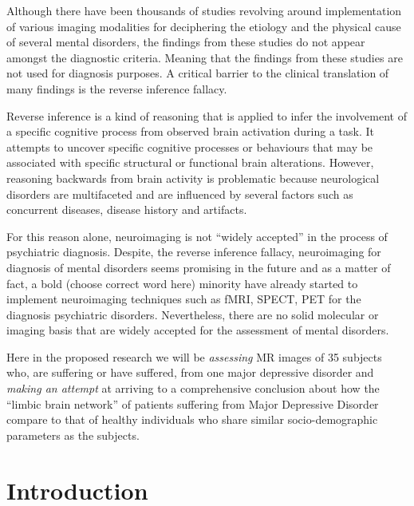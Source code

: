\documentclass{article}
\begin{document}
  Although there have been thousands of studies revolving around
  implementation of various imaging modalities for deciphering the
  etiology and the physical cause of several mental disorders, the
  findings from these studies do not appear amongst the diagnostic
  criteria. Meaning that the findings from these studies are not used
  for diagnosis purposes. A critical barrier to the clinical
  translation of many findings is the reverse inference fallacy.

  Reverse inference is a kind of reasoning that is applied to infer
  the involvement of a specific cognitive process from observed brain
  activation during a task.  It attempts to uncover specific cognitive
  processes or behaviours that may be associated with specific
  structural or functional brain alterations. However, reasoning
  backwards from brain activity is problematic because neurological
  disorders are multifaceted and are influenced by several factors
  such as concurrent diseases, disease history and artifacts.

  For this reason alone, neuroimaging is not ``widely accepted'' in
  the process of psychiatric diagnosis.  Despite, the reverse
  inference fallacy, neuroimaging for diagnosis of mental disorders
  seems promising in the future and as a matter of fact, a bold
  (choose correct word here) minority have already started to
  implement neuroimaging techniques such as fMRI, SPECT, PET for the
  diagnosis psychiatric disorders. Nevertheless, there are no solid
  molecular or imaging basis that are widely accepted for the
  assessment of mental disorders.

  Here in the proposed research we will be \textit{assessing} MR
  images of 35 subjects who, are suffering or have suffered, from one
  major depressive disorder and \textit{making an attempt} at arriving
  to a comprehensive conclusion about how the ``limbic brain network''
  of patients suffering from Major Depressive Disorder compare to that
  of healthy individuals who share similar socio-demographic
  parameters as the subjects.

\newpage

\thispagestyle{empty}
\tableofcontents
\addcontentsline{}{}{}
\newpage

\clearpage
\setcounter{page}{1}

\section{Introduction}
\end{document}
